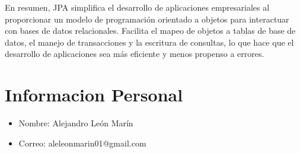 \documentclass{article}
\begin{document}
En resumen, JPA simplifica el desarrollo de aplicaciones empresariales al proporcionar un modelo de programación orientado a objetos para interactuar con bases de datos relacionales. 
Facilita el mapeo de objetos a tablas de base de datos, el manejo de transacciones y la escritura de consultas, lo que hace que el desarrollo de aplicaciones sea más eficiente y menos propenso 
a errores.

\section*{Informacion Personal}
\begin{itemize}
    \item Nombre: Alejandro León Marín
    \item Correo: aleleonmarin01@gmail.com
\end{itemize}
\end{document}
